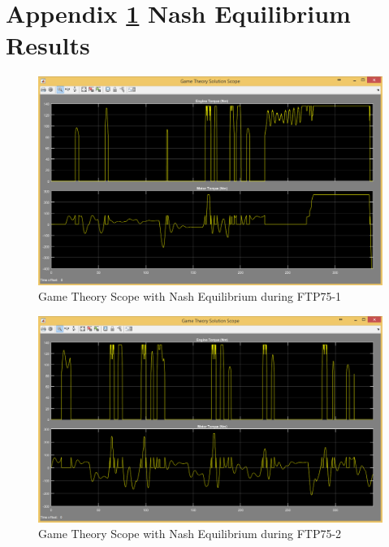 \appendix
\chapter{Appendix \ref{app:1} Nash Equilibrium Results}
\label{app:1}


\begin{figure}[h]
\centering
\includegraphics[scale=0.45]{figures/NashEquilibrium/FTP75-1/gameTheory13Juni}
\caption{Game Theory Scope with Nash Equilibrium during FTP75-1}
\label{fig:gtne1}
\end{figure}



\begin{figure}[h]
\centering
\includegraphics[scale=0.45]{figures/NashEquilibrium/FTP75-2/gameTheory13Juni}
\caption{Game Theory Scope with Nash Equilibrium during FTP75-2}
\label{fig:gtne2}
\end{figure}



